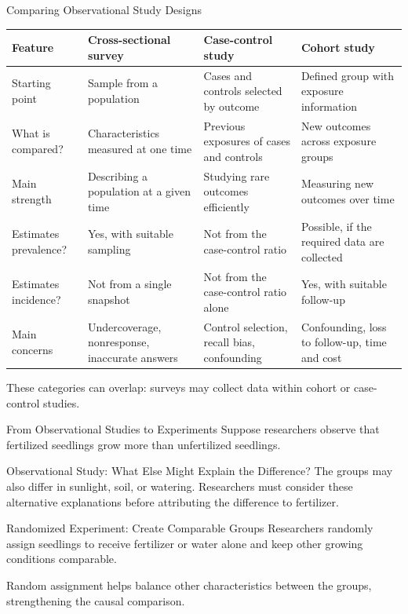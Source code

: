 \documentclass[aspectratio=169]{beamer}
\begin{document}
\begin{frame}{Comparing Observational Study Designs}
\footnotesize
\setlength{\tabcolsep}{4pt}
\renewcommand{\arraystretch}{1.25}

\begin{tabularx}{\textwidth}{
  >{\raggedright\arraybackslash}p{}
  *{3}{>{\raggedright\arraybackslash}X}
}
\toprule
\textbf{Feature}
& \textbf{Cross-sectional survey}
& \textbf{Case-control study}
& \textbf{Cohort study} \\
\midrule

Starting point
& Sample from a population
& Cases and controls selected by outcome
& Defined group with exposure information \\

What is compared?
& Characteristics measured at one time
& Previous exposures of cases and controls
& New outcomes across exposure groups \\

Main strength
& Describing a population at a given time
& Studying rare outcomes efficiently
& Measuring new outcomes over time \\

Estimates prevalence?
& Yes, with suitable sampling
& Not from the case-control ratio
& Possible, if the required data are collected \\

Estimates incidence?
& Not from a single snapshot
& Not from the case-control ratio alone
& Yes, with suitable follow-up \\

Main concerns
& Undercoverage, nonresponse, inaccurate answers
& Control selection, recall bias, confounding
& Confounding, loss to follow-up, time and cost \\

\bottomrule
\end{tabularx}

\medskip
\scriptsize
These categories can overlap: surveys may collect data within
cohort or case-control studies.
\end{frame}

\begin{frame}{From Observational Studies to Experiments}
Suppose researchers observe that fertilized seedlings grow more than unfertilized seedlings.

\begin{block}{Observational Study: What Else Might Explain the Difference?}
The groups may also differ in sunlight, soil, or watering. Researchers must consider these alternative explanations before attributing the difference to fertilizer.
\end{block}

\begin{block}{Randomized Experiment: Create Comparable Groups}
Researchers randomly assign seedlings to receive fertilizer or water alone and keep other growing conditions comparable.

Random assignment helps balance other characteristics between the groups, strengthening the causal comparison.
\end{block}

\end{frame}
\end{document}

